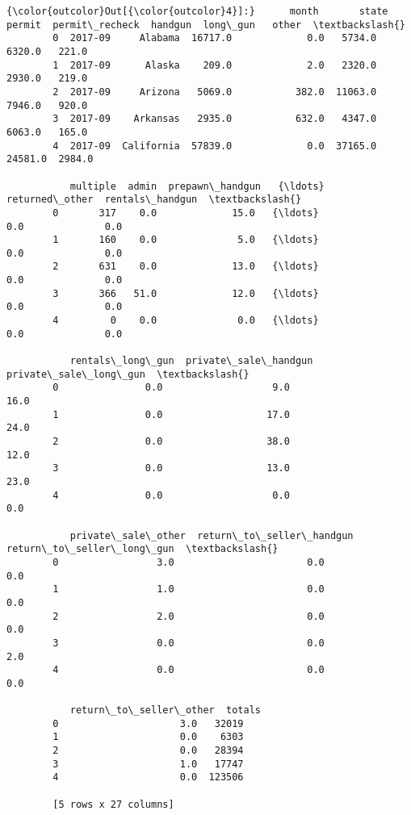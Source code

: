 \documentclass[11pt]{article}
\begin{document}
\begin{Verbatim}[commandchars=\\\{\}]
{\color{outcolor}Out[{\color{outcolor}4}]:}      month       state   permit  permit\_recheck  handgun  long\_gun   other  \textbackslash{}
        0  2017-09     Alabama  16717.0             0.0   5734.0    6320.0   221.0   
        1  2017-09      Alaska    209.0             2.0   2320.0    2930.0   219.0   
        2  2017-09     Arizona   5069.0           382.0  11063.0    7946.0   920.0   
        3  2017-09    Arkansas   2935.0           632.0   4347.0    6063.0   165.0   
        4  2017-09  California  57839.0             0.0  37165.0   24581.0  2984.0   
        
           multiple  admin  prepawn\_handgun   {\ldots}    returned\_other  rentals\_handgun  \textbackslash{}
        0       317    0.0             15.0   {\ldots}               0.0              0.0   
        1       160    0.0              5.0   {\ldots}               0.0              0.0   
        2       631    0.0             13.0   {\ldots}               0.0              0.0   
        3       366   51.0             12.0   {\ldots}               0.0              0.0   
        4         0    0.0              0.0   {\ldots}               0.0              0.0   
        
           rentals\_long\_gun  private\_sale\_handgun  private\_sale\_long\_gun  \textbackslash{}
        0               0.0                   9.0                   16.0   
        1               0.0                  17.0                   24.0   
        2               0.0                  38.0                   12.0   
        3               0.0                  13.0                   23.0   
        4               0.0                   0.0                    0.0   
        
           private\_sale\_other  return\_to\_seller\_handgun  return\_to\_seller\_long\_gun  \textbackslash{}
        0                 3.0                       0.0                        0.0   
        1                 1.0                       0.0                        0.0   
        2                 2.0                       0.0                        0.0   
        3                 0.0                       0.0                        2.0   
        4                 0.0                       0.0                        0.0   
        
           return\_to\_seller\_other  totals  
        0                     3.0   32019  
        1                     0.0    6303  
        2                     0.0   28394  
        3                     1.0   17747  
        4                     0.0  123506  
        
        [5 rows x 27 columns]
\end{Verbatim}
            
\end{document}
